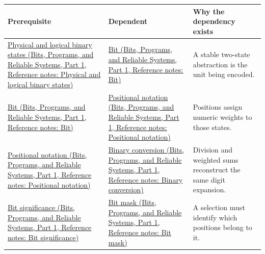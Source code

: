 {\def\LTcaptype{none} %
\begin{longtable}[]{@{}
  >{\raggedright\arraybackslash}p{}
  >{\raggedright\arraybackslash}p{}
  >{\raggedright\arraybackslash}p{}@{}}
\toprule\noalign{}
\begin{minipage}[b]{\linewidth}\raggedright
Prerequisite
\end{minipage} & \begin{minipage}[b]{\linewidth}\raggedright
Dependent
\end{minipage} & \begin{minipage}[b]{\linewidth}\raggedright
Why the dependency exists
\end{minipage} \\
\midrule\noalign{}
\endhead
\bottomrule\noalign{}
\endlastfoot
\href{../01-Bits-Programs-and-Reliable-Systems-P01/main.pdf\#appendix-ea798b1ceb35}{Physical and logical binary states (Bits, Programs, and Reliable Systems, Part 1, Reference notes: Physical and logical binary states)} & \href{../01-Bits-Programs-and-Reliable-Systems-P01/main.pdf\#appendix-ddbb69998a2e}{Bit (Bits, Programs, and Reliable Systems, Part 1, Reference notes: Bit)} & A stable two-state abstraction is the unit being encoded. \\
\href{../01-Bits-Programs-and-Reliable-Systems-P01/main.pdf\#appendix-ddbb69998a2e}{Bit (Bits, Programs, and Reliable Systems, Part 1, Reference notes: Bit)} & \href{../01-Bits-Programs-and-Reliable-Systems-P01/main.pdf\#appendix-83c3f28f7bda}{Positional notation (Bits, Programs, and Reliable Systems, Part 1, Reference notes: Positional notation)} & Positions assign numeric weights to those states. \\
\href{../01-Bits-Programs-and-Reliable-Systems-P01/main.pdf\#appendix-83c3f28f7bda}{Positional notation (Bits, Programs, and Reliable Systems, Part 1, Reference notes: Positional notation)} & \href{../01-Bits-Programs-and-Reliable-Systems-P01/main.pdf\#appendix-dc552784a2c0}{Binary conversion (Bits, Programs, and Reliable Systems, Part 1, Reference notes: Binary conversion)} & Division and weighted sums reconstruct the same digit expansion. \\
\href{../01-Bits-Programs-and-Reliable-Systems-P01/main.pdf\#appendix-280445746493}{Bit significance (Bits, Programs, and Reliable Systems, Part 1, Reference notes: Bit significance)} & \href{../01-Bits-Programs-and-Reliable-Systems-P01/main.pdf\#appendix-dbe5905163c2}{Bit mask (Bits, Programs, and Reliable Systems, Part 1, Reference notes: Bit mask)} & A selection must identify which positions belong to it. \\

\end{longtable}}
